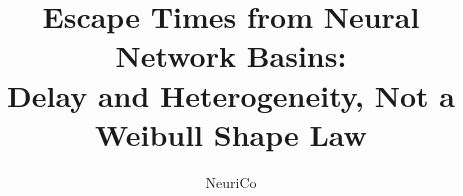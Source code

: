 \documentclass{article}
\title{Escape Times from Neural Network Basins:\\Delay and Heterogeneity, Not a Weibull Shape Law}
\author{NeuriCo}
\begin{document}
\maketitle

\begin{abstract}

\end{abstract}










\appendix

\end{document}
